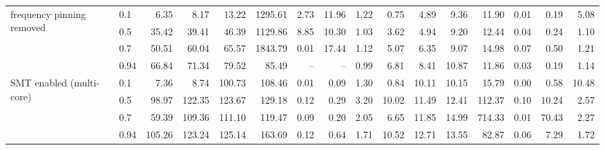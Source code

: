 \begin{table}
{\begin{tabular}{llrrrrrrrrrrrrrr}
\cmidrule{1-16}
\multirow[t]{4}{*}{frequency pinning removed} & 0.1 & 6.35 & 8.17 & 13.22 & 1295.61 & 2.73 & 11.96 & 1.22 & 0.75 & 4.89 & 9.36 & 11.90 & 0.01 & 0.19 & 5.08 \\
 & 0.5 & 35.42 & 39.41 & 46.39 & 1129.86 & 8.85 & 10.30 & 1.03 & 3.62 & 4.94 & 9.20 & 12.44 & 0.04 & 0.24 & 1.10 \\
 & 0.7 & 50.51 & 60.04 & 65.57 & 1843.79 & 0.01 & 17.44 & 1.12 & 5.07 & 6.35 & 9.07 & 14.98 & 0.07 & 0.50 & 1.21 \\
 & 0.94 & 66.84 & 71.34 & 79.52 & 85.49 & -- & -- & 0.99 & 6.81 & 8.41 & 10.87 & 11.86 & 0.03 & 0.19 & 1.14 \\
\cmidrule{1-16}
\multirow[t]{4}{*}{SMT enabled (multi-core)} & 0.1 & 7.36 & 8.74 & 100.73 & 108.46 & 0.01 & 0.09 & 1.30 & 0.84 & 10.11 & 10.15 & 15.79 & 0.00 & 0.58 & 10.48 \\
 & 0.5 & 98.97 & 122.35 & 123.67 & 129.18 & 0.12 & 0.29 & 3.20 & 10.02 & 11.49 & 12.41 & 112.37 & 0.10 & 10.24 & 2.57 \\
 & 0.7 & 59.39 & 109.36 & 111.10 & 119.47 & 0.09 & 0.20 & 2.05 & 6.65 & 11.85 & 14.99 & 714.33 & 0.01 & 70.43 & 2.27 \\
 & 0.94 & 105.26 & 123.24 & 125.14 & 163.69 & 0.12 & 0.64 & 1.71 & 10.52 & 12.71 & 13.55 & 82.87 & 0.06 & 7.29 & 1.72 \\
\cmidrule{1-16}
\bottomrule
\end{tabular}%
}
\end{table}
